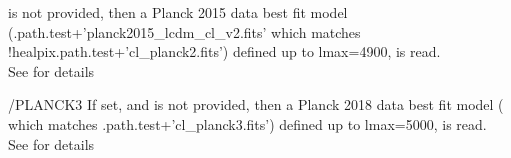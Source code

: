 \begin{keywords}
\begin{kwlist}{}
           is not provided, then a Planck 2015 data best fit
          model (.path.test+\-'planck2015\_lcdm\_cl\_v2.fits'
which matches !healpix.path.test+'cl\_planck2.fits') 
          defined up to lmax=4900, is read.\\
          See  for details
%
    \item[/PLANCK3] %
           If set, and  
           is not provided, then a Planck 2018 data best fit
          model %
   (
which matches .path.test+'cl\_planck3.fits') 
          defined up to lmax=5000, is read.\\
          See  for details


\end{kwlist}
\end{keywords}
